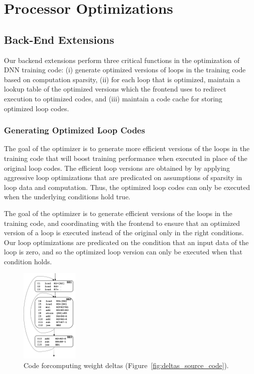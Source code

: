 \section{Processor Optimizations}
\label{sec:processor_opt}

\subsection{Back-End Extensions}
Our backend extensions perform three critical functions in the optimization of DNN training code: (i) generate optimized versions of loops in the training code based on computation sparsity, (ii)  for each loop that is optimized, maintain a lookup table of the optimized versions which the frontend uses to redirect execution to optimized codes,  and (iii) maintain a code cache for storing optimized loop codes. 

\subsubsection{Generating Optimized Loop Codes}
The goal of the optimizer is to generate more efficient versions of the loops in the training code that will boost training performance when executed in place of the original loop codes.  The efficient loop versions are obtained by by applying aggressive loop optimizations that are predicated on assumptions of sparsity in loop data and computation.  Thus, the optimized loop codes can only be executed when the underlying conditions hold true. 


The goal of the optimizer is to generate efficient versions of the loops in the training code, and coordinating with the frontend to ensure that an optimized version of a loop is executed instead of the original only in the right conditions.   Our loop optimizations are predicated on the condition that an input data of the loop is zero,  and so the optimized loop version can only be executed when that condition holds.  

\begin{figure}[h]
\centering
\includegraphics[height=1.8in]{Figures/weight-delta-code.png}
\caption{Code forcomputing  weight deltas (Figure~\ref{fig:deltas_source_code}).}
\label{fig:deltas_machine_code}
\end{figure}


